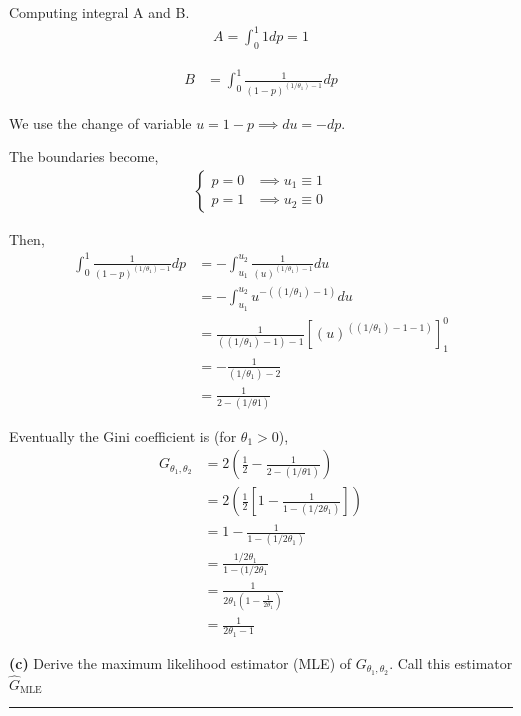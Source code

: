 \documentclass[10pt, a4paper, nofootinbib]{scrartcl}
\begin{document}
Computing integral A and B.
\begin{align*}
  A = \int_0^1 1 dp = 1
\end{align*}

\begin{align*}
  B 
    &= \int_0^1 \frac{1}{(1-p)^{(1/\theta_1) - 1}} dp
\end{align*}

We use the change of variable $u = 1 - p \implies du = -dp$. 

The boundaries become, 
\begin{align*}
  \begin{cases}
    p = 0 &\implies u_1 \equiv 1 \\
    p = 1 &\implies u_2 \equiv 0
  \end{cases}
\end{align*}

Then, 
\begin{align*}
  \int_0^1 \frac{1}{(1-p)^{(1/\theta_1) - 1}} dp
    &= - \int_{u_1}^{u_2} \frac{1}{(u)^{(1/\theta_1) - 1}} du \\
    &= - \int_{u_1}^{u_2} u^{-((1/\theta_1) - 1)} du \\
    &= \frac{1}{((1/\theta_1) - 1) - 1} \left[ (u)^{((1/\theta_1) - 1 - 1)} \right]_1^0 \\
    &= -\frac{1}{(1/\theta_1) - 2} \\
    &= \frac{1}{2 - (1/\theta1)}
\end{align*}

Eventually the Gini coefficient is (for $\theta_1 > 0$),
\begin{align*}
  G_{\theta_1, \theta_2} 
    &= 2 \left( \frac{1}{2} - \frac{1}{2 - (1/\theta1)} \right) \\
    &= 2 \left( \frac{1}{2} \left[ 1 - \frac{1}{1 - (1/2\theta_1)} \right] \right) \\
    &= 1 - \frac{1}{1 - (1/2\theta_1)} \\
    &= \frac{1/2\theta_1}{1 - (1/2\theta_1} \\
    &= \frac{1}{2\theta_1 \left( 1 - \frac{1}{2\theta_1} \right)} \\
    &= \frac{1}{2\theta_1 - 1}
\end{align*}

\textbf{(c)} Derive the maximum likelihood estimator (MLE) of $G_{\theta_1, \theta_2}$. Call this estimator $\hat{G}_{\text{MLE}}$

\begin{center}\rule{6cm}{0.4pt}\end{center}
\end{document}
